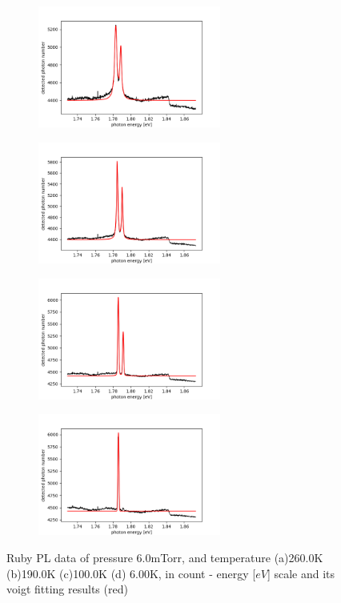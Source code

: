 \documentclass{article}
\begin{document}
 \begin{figure}[ht]
  \centering
  \begin{subfigure}[b]{6cm}
      \centering
      \includegraphics[width=6cm]{../results/Ruby(260.0)_voigt_fitted_fig.png}
      \caption{}
  \end{subfigure}
  \hfill
  \begin{subfigure}[b]{6cm}
      \centering
      \includegraphics[width=6cm]{../results/Ruby(190.0)_voigt_fitted_fig.png}
      \caption{}
  \end{subfigure}
  \hfill
  \begin{subfigure}[b]{6cm}
    \centering
    \includegraphics[width=6cm]{../results/Ruby(100.0)_voigt_fitted_fig.png}
    \caption{}
\end{subfigure}
\hfill
\begin{subfigure}[b]{6cm}
  \centering
  \includegraphics[width=6cm]{../results/Ruby(9.2)_voigt_fitted_fig.png}
  \caption{}
\end{subfigure}
\hfill
  \caption{Ruby PL data of pressure 6.0mTorr, and temperature (a)260.0K (b)190.0K (c)100.0K (d) 6.00K, in count - energy [$eV$] scale and its voigt fitting results (red)}
  \label{fig:Ruby_fitted_data}
\end{figure}
\end{document}
